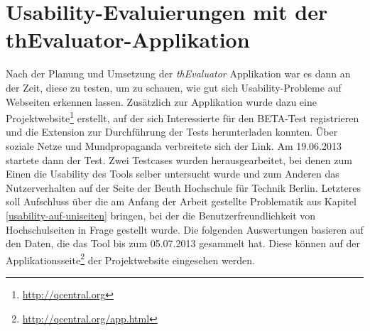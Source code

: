%
%
%
%

\chapter{Usability-Evaluierungen mit der thEvaluator-Applikation}

Nach der Planung und Umsetzung der \textit{thEvaluator} Applikation war es dann an der Zeit, diese zu testen, um zu schauen, wie gut sich Usability-Probleme auf Webseiten erkennen lassen. Zusätzlich zur Applikation wurde dazu eine Projektwebsite\footnote{\url{http://qcentral.org}} erstellt, auf der sich Interessierte für den BETA-Test registrieren und die Extension zur Durchführung der Tests herunterladen konnten. Über soziale Netze und Mundpropaganda verbreitete sich der Link. Am 19.06.2013 startete dann der Test. Zwei Testcases wurden herausgearbeitet, bei denen zum Einen die Usability des Tools selber untersucht wurde und zum Anderen das Nutzerverhalten auf der Seite der Beuth Hochschule für Technik Berlin. Letzteres soll Aufschluss über die am Anfang der Arbeit gestellte Problematik aus Kapitel \ref{usability-auf-uniseiten} bringen, bei der die Benutzerfreundlichkeit von Hochschulseiten in Frage gestellt wurde. Die folgenden Auswertungen basieren auf den Daten, die das Tool bis zum 05.07.2013 gesammelt hat. Diese können auf der Applikationsseite\footnote{\url{http://qcentral.org/app.html}} der Projektwebsite eingesehen werden.

\newpage


